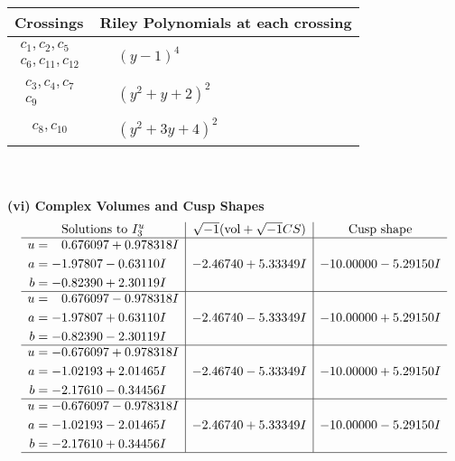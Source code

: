 \documentclass[1p]{elsarticle_modified}
\theoremstyle{definition}
\newcommand{\I}{\sqrt{-1}}
\begin{document}
\begin{tabular}{m{50pt}|m{274pt}}
Crossings & \hspace{64pt}Riley Polynomials at each crossing \\
\hline $$\begin{aligned}c_{1},c_{2},c_{5}\\c_{6},c_{11},c_{12}\end{aligned}$$&$\begin{aligned}
&(y-1)^4
\end{aligned}$\\
\hline $$\begin{aligned}c_{3},c_{4},c_{7}\\c_{9}\end{aligned}$$&$\begin{aligned}
&(y^2+y+2)^2
\end{aligned}$\\
\hline $$\begin{aligned}c_{8},c_{10}\end{aligned}$$&$\begin{aligned}
&(y^2+3 y+4)^2
\end{aligned}$\\
\hline
\end{tabular}\\~\\
\newpage\flushleft \textbf{(vi) Complex Volumes and Cusp Shapes}
$$\begin{array}{c|c|c}  
\text{Solutions to }I^u_{3}& \I (\text{vol} + \sqrt{-1}CS) & \text{Cusp shape}\\
 \hline 
\begin{aligned}
u &= \phantom{-}0.676097 + 0.978318 I \\
a &= -1.97807 - 0.63110 I \\
b &= -0.82390 + 2.30119 I\end{aligned}
 & -2.46740 + 5.33349 I & -10.00000 - 5.29150 I \\ \hline\begin{aligned}
u &= \phantom{-}0.676097 - 0.978318 I \\
a &= -1.97807 + 0.63110 I \\
b &= -0.82390 - 2.30119 I\end{aligned}
 & -2.46740 - 5.33349 I & -10.00000 + 5.29150 I \\ \hline\begin{aligned}
u &= -0.676097 + 0.978318 I \\
a &= -1.02193 + 2.01465 I \\
b &= -2.17610 - 0.34456 I\end{aligned}
 & -2.46740 - 5.33349 I & -10.00000 + 5.29150 I \\ \hline\begin{aligned}
u &= -0.676097 - 0.978318 I \\
a &= -1.02193 - 2.01465 I \\
b &= -2.17610 + 0.34456 I\end{aligned}
 & -2.46740 + 5.33349 I & -10.00000 - 5.29150 I\\
 \hline 
 \end{array}$$\newpage\newpage\renewcommand{\arraystretch}{1}
\end{document}
